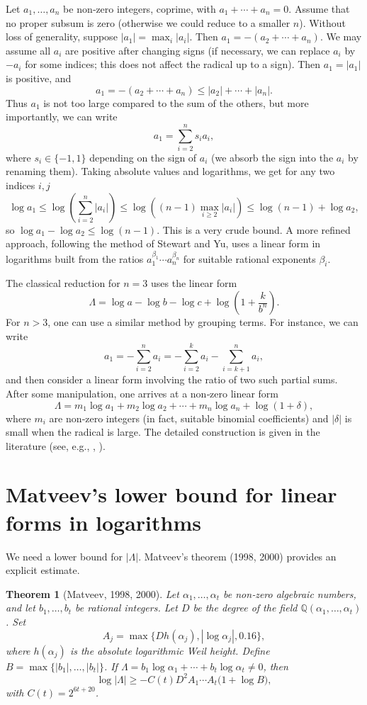 \documentclass[11pt,a4paper]{article}
\newtheorem{theorem}{Theorem}[section]
\begin{document}
Let $a_1,\dots,a_n$ be non‑zero integers, coprime, with $a_1+\cdots+a_n=0$. Assume that no proper subsum is zero (otherwise we could reduce to a smaller $n$). Without loss of generality, suppose $|a_1| = \max_i |a_i|$. Then $a_1 = -(a_2+\cdots+a_n)$. We may assume all $a_i$ are positive after changing signs (if necessary, we can replace $a_i$ by $-a_i$ for some indices; this does not affect the radical up to a sign). Then $a_1 = |a_1|$ is positive, and
\[
a_1 = -(a_2+\cdots+a_n) \le |a_2|+\cdots+|a_n|.
\]
Thus $a_1$ is not too large compared to the sum of the others, but more importantly, we can write
\[
a_1 = \sum_{i=2}^n s_i a_i,
\]
where $s_i \in \{-1,1\}$ depending on the sign of $a_i$ (we absorb the sign into the $a_i$ by renaming them). Taking absolute values and logarithms, we get for any two indices $i,j$
\[
\log a_1 \le \log\left(\sum_{i=2}^n |a_i|\right) \le \log\left( (n-1)\max_{i\ge 2}|a_i| \right) \le \log(n-1) + \log a_2,
\]
so $\log a_1 - \log a_2 \le \log(n-1)$. This is a very crude bound. A more refined approach, following the method of Stewart and Yu, uses a linear form in logarithms built from the ratios $a_1^{\beta_1} \cdots a_n^{\beta_n}$ for suitable rational exponents $\beta_i$.

The classical reduction for $n=3$ uses the linear form
\[
\Lambda = \log a - \log b - \log c + \log\left(1 + \frac{k}{b^n}\right).
\]
For $n>3$, one can use a similar method by grouping terms. For instance, we can write
\[
a_1 = -\sum_{i=2}^n a_i = -\sum_{i=2}^{k} a_i - \sum_{i=k+1}^n a_i,
\]
and then consider a linear form involving the ratio of two such partial sums. After some manipulation, one arrives at a non‑zero linear form
\[
\Lambda = m_1 \log a_1 + m_2 \log a_2 + \cdots + m_n \log a_n + \log(1+\delta),
\]
where $m_i$ are non‑zero integers (in fact, suitable binomial coefficients) and $|\delta|$ is small when the radical is large. The detailed construction is given in the literature (see, e.g., \cite{stewart-yu1991}, \cite{browkin-brzezinski1994}).

\section{Matveev's lower bound for linear forms in logarithms}

We need a lower bound for $|\Lambda|$. Matveev's theorem (1998, 2000) provides an explicit estimate.

\begin{theorem}[Matveev, 1998, 2000]\label{thm:matveev}
Let $\alpha_1,\dots,\alpha_t$ be non‑zero algebraic numbers, and let $b_1,\dots,b_t$ be rational integers. Let $D$ be the degree of the field $\mathbb{Q}(\alpha_1,\dots,\alpha_t)$. Set
\[
A_j = \max\{D h(\alpha_j), |\log \alpha_j|, 0.16\},
\]
where $h(\alpha_j)$ is the absolute logarithmic Weil height. Define $B = \max\{|b_1|,\dots,|b_t|\}$. If $\Lambda = b_1\log\alpha_1 + \cdots + b_t\log\alpha_t \neq 0$, then
\[
\log|\Lambda| \ge -C(t) D^2 A_1\cdots A_t \bigl(1 + \log B\bigr),
\]
with $C(t) = 2^{6t+20}$.
\end{theorem}
\end{document}
